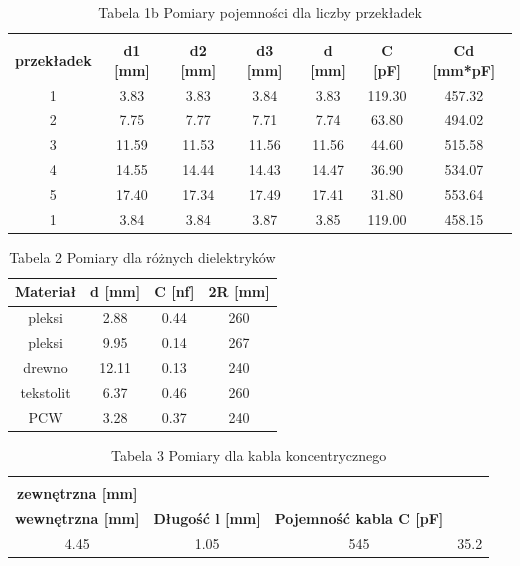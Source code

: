 \documentclass{fizykalab}
\begin{document}
{\begin{table}[!ht]
	\centering
	\begin{tabular}{|c|c|c|c|c|c|c|}
		\hline
		\makecell{\textbf{Liczba} \\ \textbf{przekładek}} & \textbf{d1 [mm]} & \textbf{d2 [mm]} & \textbf{d3 [mm]} & \textbf{d [mm]} & \textbf{C [pF]} & \textbf{Cd [mm*pF]} \\ \hline
		1 & 3.83 & 3.83 & 3.84 & 3.83 & 119.30 & 457.32 \\ \hline
		2 & 7.75 & 7.77 & 7.71 & 7.74 & 63.80 & 494.02 \\ \hline
		3 & 11.59 & 11.53 & 11.56 & 11.56 & 44.60 & 515.58 \\ \hline
		4 & 14.55 & 14.44 & 14.43 & 14.47 & 36.90 & 534.07 \\ \hline
		5 & 17.40 & 17.34 & 17.49 & 17.41 & 31.80 & 553.64 \\ \hline
		1 & 3.84 & 3.84 & 3.87 & 3.85 & 119.00 & 458.15 \\ \hline
	\end{tabular}
	\caption*{Tabela 1b Pomiary pojemności dla liczby przekładek}
\end{table}

\begin{table}[!ht]
	\centering
	\begin{tabular}{|c|c|c|c|}
		\hline
		\textbf{Materiał} & \textbf{d [mm]} & \textbf{C [nf]} & \textbf{2R [mm]} \\ \hline
		pleksi & 2.88 & 0.44 & 260 \\ \hline
		pleksi & 9.95 & 0.14 & 267 \\ \hline
		drewno & 12.11 & 0.13 & 240 \\ \hline
		tekstolit & 6.37 & 0.46 & 260 \\ \hline
		PCW & 3.28 & 0.37 & 240 \\ \hline
	\end{tabular}
	\caption*{Tabela 2 Pomiary dla różnych dielektryków}
\end{table}

\begin{table}[!ht]
	\centering
	\begin{tabular}{|c|c|c|c|}
		\hline
		\makecell{\textbf{Średnica}\\\textbf{zewnętrzna [mm]}}  & \makecell{\textbf{Średnica}\\\textbf{wewnętrzna [mm]}} & \textbf{Długość l [mm]} & \textbf{Pojemność kabla C [pF]} \\ \hline
		4.45 & 1.05 & 545 & 35.2 \\ \hline
	\end{tabular}
	\caption*{Tabela 3 Pomiary dla kabla koncentrycznego}
\end{table}

}
\end{document}
